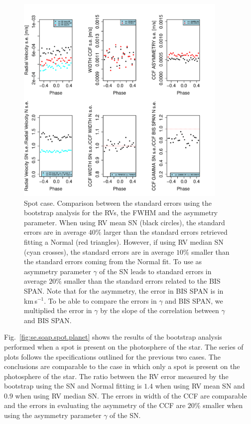 \documentclass[11pt, oneside]{article}
\def\kms{\hbox{\,km\,s$^{-1}$}}       %
\begin{document}
\begin{figure}[htbp]
   \centering
\includegraphics[height = 4in]{RV_comparison_SPOT_standard_errors.pdf} 
   \caption{Spot case. Comparison between the standard errors using the bootstrap analysis for the RVs, the FWHM and the asymmetry parameter. When using RV mean SN (black circles), the standard errors are in average $40\%$ larger than the standard errors retrieved fitting a Normal (red triangles). However, if using RV median SN (cyan crosses), the standard errors are in average $10\%$ smaller than the standard errors coming from the Normal fit. To use as asymmetry parameter $\gamma$ of the SN leads to standard errors in average $20\%$ smaller than the standard errors related to the BIS SPAN. Note that for the asymmetry, the error in BIS SPAN is in \kms. To be able to compare the errors in $\gamma$ and BIS SPAN, we multiplied the error in $\gamma$ by the slope of the correlation between $\gamma$ and BIS SPAN.}
   \label{fig:se.soap.spot}
\end{figure}

Fig.~\ref{fig:se.soap.spot.planet} shows the results of the bootstrap analysis performed when a spot is present on the photosphere of the star. The series of plots follows the specifications outlined for the previous two cases. The conclusions are comparable to the case in which only a spot is present on the photosphere of the star. The ratio between the RV error measured by the bootstrap using the SN and Normal fitting is $1.4$ when using RV mean SN and $0.9$ when using RV median SN. The errors in width of the CCF are comparable and the errors in evaluating the asymmetry of the CCF are $20\%$ smaller when using the asymmetry parameter $\gamma$ of the SN.
\end{document}
